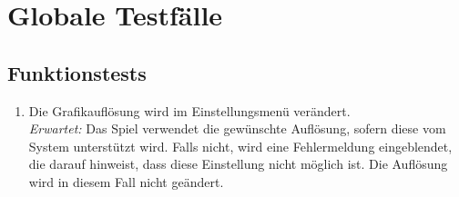 \chapter{Globale Testfälle}

\renewcommand{\theenumi}{/T\_\arabic{enumi}0/}
\renewcommand{\labelenumi}{\theenumi}

\section{Funktionstests}

\begin{enumerate}
\item Die Grafikauflösung wird im Einstellungsmenü verändert.\\
	 	\textit{Erwartet:} Das Spiel verwendet die gewünschte Auflösung, sofern diese vom System unterstützt wird. Falls nicht, wird eine Fehlermeldung eingeblendet, die darauf hinweist, dass diese Einstellung nicht möglich ist. Die Auflösung wird in diesem Fall nicht geändert.
	 	

\end{enumerate}
